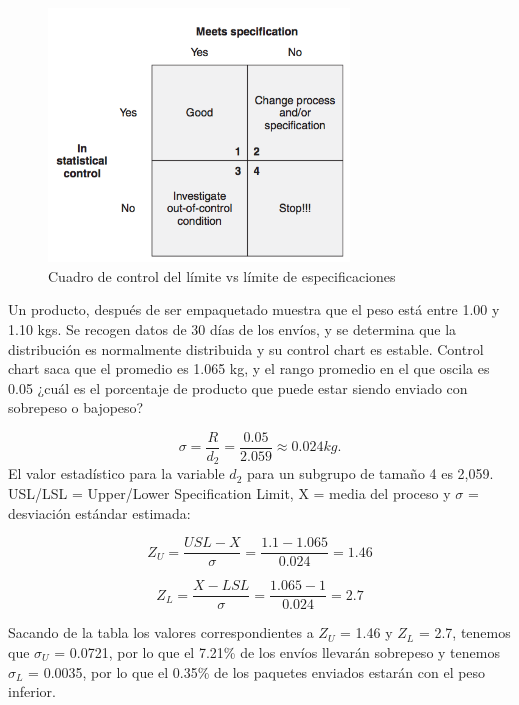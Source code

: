 \documentclass[]{article}
\begin{document}
\begin{figure}[H]
	\centering
	\includegraphics[width=80mm]{imagenes/Controllimitversusspecificationlimitgrid.png}
	\caption{Cuadro de control del límite vs límite de especificaciones}
	\label{fig:Controllimitversusspecificationlimitgrid}
\end{figure}

Un producto, después de ser empaquetado muestra que el peso está entre 1.00 y 1.10 kgs. Se recogen datos de 30 días de los envíos, y se determina que la distribución es normalmente distribuida y su control chart es estable. Control chart saca que el promedio es 1.065 kg, y el rango promedio en el que oscila es 0.05 ¿cuál es el porcentaje de producto que puede estar siendo enviado con sobrepeso o bajopeso?

\begin{equation}
\sigma = \frac{R}{d_2} = \frac{0.05}{2.059} \approx 0.024 kg.
\end{equation}
El valor estadístico para la variable $d_2$ para un subgrupo de tamaño 4 es 2,059. USL/LSL = Upper/Lower Specification Limit, X = media del proceso y $\sigma$ = desviación estándar estimada:

\begin{equation}
Z_U = \frac{USL - X}{\sigma} = \frac{1.1 - 1.065}{0.024} = 1.46
\end{equation}

\begin{equation}
Z_L = \frac{X - LSL}{\sigma} = \frac{1.065 - 1}{0.024} = 2.7
\end{equation}

Sacando de la tabla los valores correspondientes a $Z_U$ = 1.46 y $Z_L$ = 2.7, tenemos que $\sigma_U$ = 0.0721, por lo que el 7.21\% de los envíos llevarán sobrepeso y tenemos $\sigma_L$ = 0.0035, por lo que el 0.35\% de los paquetes enviados estarán con el peso inferior.
\end{document}
